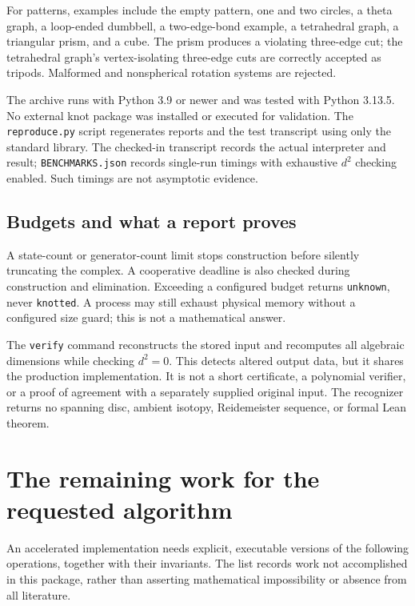 \documentclass[11pt]{article}
\theoremstyle{definition}\newtheorem{definition}[theorem]{Definition}
\begin{document}
For patterns, examples include the empty pattern, one and two circles, a theta
graph, a loop-ended dumbbell, a two-edge-bond example, a tetrahedral graph, a
triangular prism, and a cube. The prism produces a violating three-edge cut;
the tetrahedral graph's vertex-isolating three-edge cuts are correctly accepted
as tripods. Malformed and nonspherical rotation systems are rejected.

The archive runs with Python 3.9 or newer and was tested with Python 3.13.5.
No external knot package was installed or executed for validation. The
\texttt{reproduce.py} script regenerates reports and the test transcript using
only the standard library. The checked-in transcript records the actual
interpreter and result; \texttt{BENCHMARKS.json} records single-run timings
with exhaustive $d^2$ checking enabled. Such timings are not asymptotic evidence.

\subsection{Budgets and what a report proves}

A state-count or generator-count limit stops construction before silently
truncating the complex. A cooperative deadline is also checked during
construction and elimination. Exceeding a configured budget returns
\texttt{unknown}, never \texttt{knotted}. A process may still exhaust physical
memory without a configured size guard; this is not a mathematical answer.

The \texttt{verify} command reconstructs the stored input and recomputes all
algebraic dimensions while checking $d^2=0$. This detects altered output data,
but it shares the production implementation. It is not a short certificate,
a polynomial verifier, or a proof of agreement with a separately supplied
original input. The recognizer returns no spanning disc, ambient isotopy,
Reidemeister sequence, or formal Lean theorem.

\section{The remaining work for the requested algorithm}

An accelerated implementation needs explicit, executable versions of the
following operations, together with their invariants. The list records work
not accomplished in this package, rather than asserting mathematical
impossibility or absence from all literature.
\end{document}

